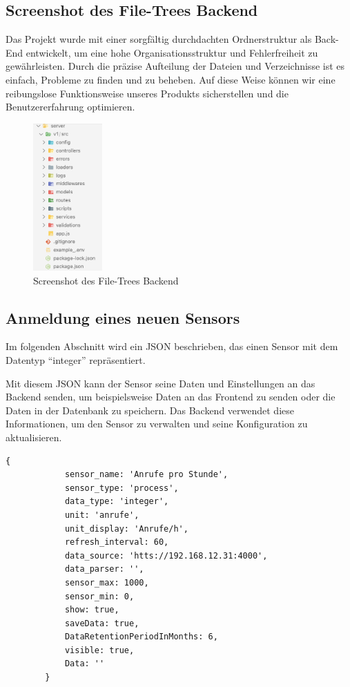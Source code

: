 \subsection{Screenshot des File-Trees Backend}\label{appendix:b5}\par
Das Projekt wurde mit einer sorgfältig durchdachten Ordnerstruktur als Back-End entwickelt, um eine hohe Organisationsstruktur und Fehlerfreiheit zu gewährleisten.
Durch die präzise Aufteilung der Dateien und Verzeichnisse ist es einfach, Probleme zu finden und zu beheben.
Auf diese Weise können wir eine reibungslose Funktionsweise unseres Produkts sicherstellen und die Benutzererfahrung optimieren.
\begin{figure}[htbp]
	\centering
	\includegraphics[width=100px]{img/vsd.png}
	\caption{Screenshot des File-Trees Backend}
\end{figure}
\clearpage


\subsection{Anmeldung eines neuen Sensors}\label{appendix:b3}\par
Im folgenden Abschnitt wird ein \acs{JSON} beschrieben, das einen Sensor mit dem Datentyp “integer” repräsentiert.


Mit diesem \acs{JSON} kann der Sensor seine Daten und Einstellungen an das Backend senden, um beispielsweise Daten an das Frontend zu senden oder die Daten in der Datenbank zu speichern. Das Backend verwendet diese Informationen, um den Sensor zu verwalten und seine Konfiguration zu aktualisieren.
	\begin{lstlisting}[caption={Anmeldung eines neuen Sensors (Backend)  JSON-Modell}, style=js]
		{
			sensor_name: 'Anrufe pro Stunde',
			sensor_type: 'process',
			data_type: 'integer',
			unit: 'anrufe',
			unit_display: 'Anrufe/h',
			refresh_interval: 60,
			data_source: 'htts://192.168.12.31:4000',
			data_parser: '',
			sensor_max: 1000,
			sensor_min: 0,
			show: true,
			saveData: true,
			DataRetentionPeriodInMonths: 6,
			visible: true,
			Data: ''
		}
	\end{lstlisting}
\clearpage



